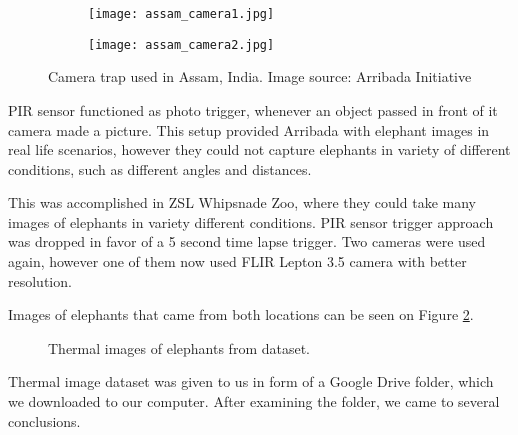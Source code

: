 \begin{figure}[ht]
    \begin{subfigure}{0.5\textwidth}
        \centering
        \texttt{[image: assam\_camera1.jpg]} 
    \end{subfigure}
    \begin{subfigure}{0.5\textwidth}
        \centering
        \texttt{[image: assam\_camera2.jpg]}
    \end{subfigure}
    \caption{Camera trap used in Assam, India. Image source: Arribada Initiative \cite{arribada-assam}}
    \label{assam_camera}
\end{figure}

PIR sensor functioned as photo trigger, whenever an object passed in front of it camera made a picture.
This setup provided Arribada with elephant images in real life scenarios, however they could not capture elephants in variety of different conditions, such as different angles and distances.

This was accomplished in ZSL Whipsnade Zoo, where they could take many images of elephants in variety different conditions\cite{dataset_collection}.
PIR sensor trigger approach was dropped in favor of a 5 second time lapse trigger.
Two cameras were used again, however one of them now used FLIR Lepton 3.5 camera with better resolution.

Images of elephants that came from both locations can be seen on Figure \ref{four_elephants}.

\begin{figure}[ht]
    \centering
    \caption{Thermal images of elephants from dataset.}
    \label{four_elephants}
\end{figure}

Thermal image dataset was given to us in form of a Google Drive folder, which we downloaded to our computer.
After examining the folder, we came to several conclusions.


